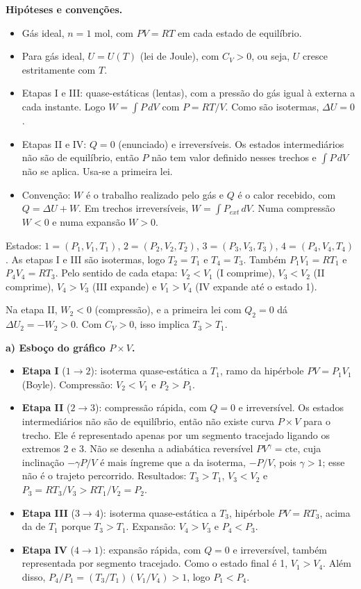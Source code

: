 \documentclass{article}%
\begin{document}
\noindent\textbf{Hipóteses e convenções.}
\begin{itemize}
  \item Gás ideal, $n = 1$ mol, com $PV = RT$ em cada estado de equilíbrio.
  \item Para gás ideal, $U = U(T)$ (lei de Joule), com $C_V > 0$, ou seja, $U$ cresce estritamente com $T$.
  \item Etapas I e III: quase-estáticas (lentas), com a pressão do gás igual à externa a cada instante. Logo $W = \int P\,dV$ com $P = RT/V$. Como são isotermas, $\Delta U = 0$.
  \item Etapas II e IV: $Q = 0$ (enunciado) e irreversíveis. Os estados intermediários não são de equilíbrio, então $P$ não tem valor definido nesses trechos e $\int P\,dV$ não se aplica. Usa-se a primeira lei.
  \item Convenção: $W$ é o trabalho realizado pelo gás e $Q$ é o calor recebido, com $Q = \Delta U + W$. Em trechos irreversíveis, $W = \int P_{ext}\,dV$. Numa compressão $W < 0$ e numa expansão $W > 0$.
\end{itemize}

Estados: $1 = (P_1,V_1,T_1)$, $2 = (P_2,V_2,T_2)$, $3 = (P_3,V_3,T_3)$, $4 = (P_4,V_4,T_4)$. As etapas I e III são isotermas, logo $T_2 = T_1$ e $T_4 = T_3$. Também $P_1V_1 = RT_1$ e $P_4V_4 = RT_3$. Pelo sentido de cada etapa: $V_2 < V_1$ (I comprime), $V_3 < V_2$ (II comprime), $V_4 > V_3$ (III expande) e $V_1 > V_4$ (IV expande até o estado 1).

Na etapa II, $W_2 < 0$ (compressão), e a primeira lei com $Q_2 = 0$ dá $\Delta U_2 = -W_2 > 0$. Com $C_V > 0$, isso implica $T_3 > T_1$.

\noindent\textbf{a) Esboço do gráfico $P \times V$.}
\begin{itemize}
  \item \textbf{Etapa I} ($1 \to 2$): isoterma quase-estática a $T_1$, ramo da hipérbole $PV = P_1V_1$ (Boyle). Compressão: $V_2 < V_1$ e $P_2 > P_1$.
  \item \textbf{Etapa II} ($2 \to 3$): compressão rápida, com $Q = 0$ e irreversível. Os estados intermediários não são de equilíbrio, então não existe curva $P \times V$ para o trecho. Ele é representado apenas por um segmento tracejado ligando os extremos 2 e 3. Não se desenha a adiabática reversível $PV^{\gamma} = \text{cte}$, cuja inclinação $-\gamma P/V$ é mais íngreme que a da isoterma, $-P/V$, pois $\gamma > 1$; esse não é o trajeto percorrido. Resultados: $T_3 > T_1$, $V_3 < V_2$ e $P_3 = RT_3/V_3 > RT_1/V_2 = P_2$.
  \item \textbf{Etapa III} ($3 \to 4$): isoterma quase-estática a $T_3$, hipérbole $PV = RT_3$, acima da de $T_1$ porque $T_3 > T_1$. Expansão: $V_4 > V_3$ e $P_4 < P_3$.
  \item \textbf{Etapa IV} ($4 \to 1$): expansão rápida, com $Q = 0$ e irreversível, também representada por segmento tracejado. Como o estado final é 1, $V_1 > V_4$. Além disso, $P_4/P_1 = (T_3/T_1)(V_1/V_4) > 1$, logo $P_1 < P_4$.
\end{itemize}
\end{document}
